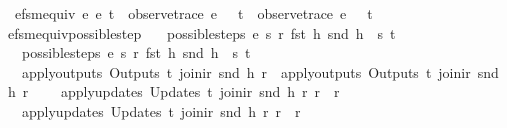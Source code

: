 \begin{isabellebody}
\ \ {\isachardoublequoteopen}efsm{\isacharunderscore}equiv\ e{}\ e{}\ t\ {\isasymequiv}\ {\isacharparenleft}{\isacharparenleft}observe{\isacharunderscore}trace\ e{}\ {}\ {\isacharless}{\isachargreater}\ t{\isacharparenright}\ {\isacharequal}\ {\isacharparenleft}observe{\isacharunderscore}trace\ e{}\ {}\ {\isacharless}{\isachargreater}\ t{\isacharparenright}{\isacharparenright}{\isachardoublequoteclose}\isanewline
\isanewline
{}\isamarkupfalse%
\ efsm{\isacharunderscore}equiv{\isacharunderscore}possible{\isacharunderscore}step{\isacharcolon}\ \isanewline
\ \ {\isachardoublequoteopen}possible{\isacharunderscore}steps\ e{}\ s{}\ r{}\ {\isacharparenleft}fst\ h{\isacharparenright}\ {\isacharparenleft}snd\ h{\isacharparenright}\ {\isacharequal}\ {\isacharbraceleft}{\isacharbar}{\isacharparenleft}s{}{\isacharprime}{\isacharcomma}\ t{}{\isacharparenright}{\isacharbar}{\isacharbraceright}\ {\isasymLongrightarrow}\isanewline
\ \ \ possible{\isacharunderscore}steps\ e{}\ s{}\ r{}\ {\isacharparenleft}fst\ h{\isacharparenright}\ {\isacharparenleft}snd\ h{\isacharparenright}\ {\isacharequal}\ {\isacharbraceleft}{\isacharbar}{\isacharparenleft}s{}{\isacharprime}{\isacharcomma}\ t{}{\isacharparenright}{\isacharbar}{\isacharbraceright}\ {\isasymLongrightarrow}\isanewline
\ \ \ apply{\isacharunderscore}outputs\ {\isacharparenleft}Outputs\ t{}{\isacharparenright}\ {\isacharparenleft}join{\isacharunderscore}ir\ {\isacharparenleft}snd\ h{\isacharparenright}\ r{}{\isacharparenright}\ {\isacharequal}\ apply{\isacharunderscore}outputs\ {\isacharparenleft}Outputs\ t{}{\isacharparenright}\ {\isacharparenleft}join{\isacharunderscore}ir\ {\isacharparenleft}snd\ h{\isacharparenright}\ r{}{\isacharparenright}\ {\isasymLongrightarrow}\isanewline
\ \ \ apply{\isacharunderscore}updates\ {\isacharparenleft}Updates\ t{}{\isacharparenright}\ {\isacharparenleft}join{\isacharunderscore}ir\ {\isacharparenleft}snd\ h{\isacharparenright}\ r{}{\isacharparenright}\ r{}\ {\isacharequal}\ r{}{\isacharprime}\ {\isasymLongrightarrow}\isanewline
\ \ \ apply{\isacharunderscore}updates\ {\isacharparenleft}Updates\ t{}{\isacharparenright}\ {\isacharparenleft}join{\isacharunderscore}ir\ {\isacharparenleft}snd\ h{\isacharparenright}\ r{}{\isacharparenright}\ r{}\ {\isacharequal}\ r{}{\isacharprime}\ {\isasymLongrightarrow}\isanewline

\end{isabellebody}
